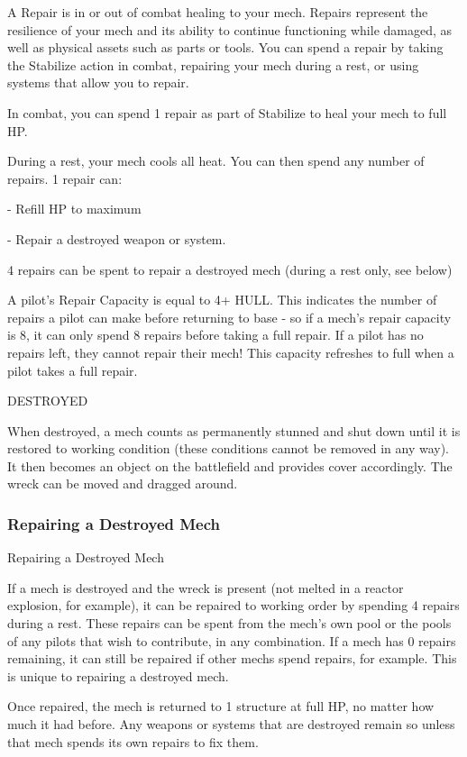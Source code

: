 A Repair is in or out of combat healing to your mech. Repairs represent the resilience of your  
mech and its ability to continue functioning while damaged, as well as physical assets such as  
parts or tools. You can spend a repair by taking the Stabilize action in combat, repairing your  
mech during a rest, or using systems that allow you to repair.
 

In combat, you can spend 1 repair as part of Stabilize to heal your mech to full HP.
 

During a rest, your mech cools all heat. You can then spend any number of repairs. 1 repair can:
 
    -    Refill HP to maximum
 
    -    Repair a destroyed weapon or system.
 
4 repairs can be spent to repair a destroyed mech (during a rest only, see below)
 

A pilot’s Repair Capacity is equal to 4+ HULL. This indicates the number of repairs a pilot can  
make before returning to base - so if a mech’s repair capacity is 8, it can only spend 8 repairs  
before taking a full repair. If a pilot has no repairs left, they cannot repair their mech! This  
capacity refreshes to full when a pilot takes a full repair.
 

                                                 DESTROYED  

When destroyed, a mech counts as permanently stunned and shut down until it is restored to  
working condition (these conditions cannot be removed in any way). It then becomes an object  
on the battlefield and provides cover accordingly. The wreck can be moved and dragged around.
 
\subsubsection{Repairing a Destroyed Mech}
                                  Repairing a Destroyed Mech  

If a mech is destroyed and the wreck is present (not melted in a reactor explosion, for example), it  
can be repaired to working order by spending 4 repairs during a rest. These repairs can be spent  
from the mech’s own pool or the pools of any pilots that wish to contribute, in any combination. If a  
mech has 0 repairs remaining, it can still be repaired if other mechs spend repairs, for example.  
This is unique to repairing a destroyed mech.  

Once repaired, the mech is returned to 1 structure at full HP, no matter how much it had before.  
Any weapons or systems that are destroyed remain so unless that mech spends its own repairs to  
fix them.  
